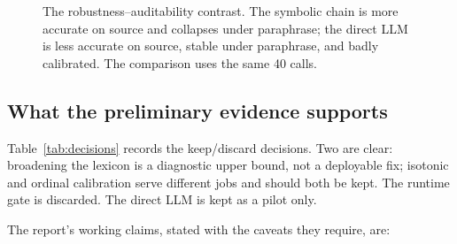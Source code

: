\documentclass[11pt,a4paper]{article}
\begin{document}
\begin{figure}[t]
\centering
{}
\caption{The robustness--auditability contrast. The symbolic chain is more accurate on source and
collapses under paraphrase; the direct LLM is less accurate on source, stable under paraphrase,
and badly calibrated. The comparison uses the same 40 calls.}
\label{fig:llm}
\end{figure}

\subsection{What the preliminary evidence supports}

Table~\ref{tab:decisions} records the keep/discard decisions. Two are clear: broadening the
lexicon is a diagnostic upper bound, not a deployable fix; isotonic and ordinal calibration serve
different jobs and should both be kept. The runtime gate is discarded. The direct LLM is kept as
a pilot only.



The report's working claims, stated with the caveats they require, are:
\end{document}
